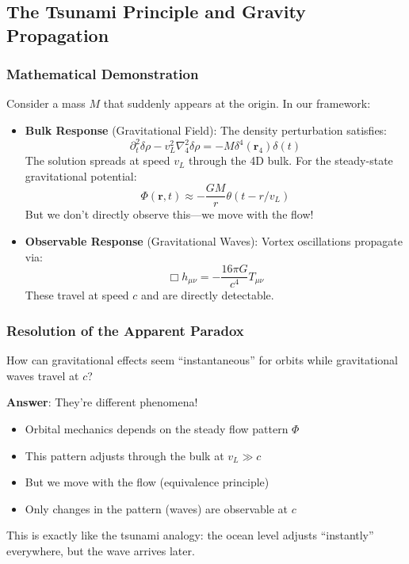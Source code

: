 \subsection{The Tsunami Principle and Gravity Propagation}

\subsubsection{Mathematical Demonstration}

Consider a mass $M$ that suddenly appears at the origin. In our framework:

\begin{itemize}
\item \textbf{Bulk Response} (Gravitational Field): The density perturbation satisfies:
$$\partial_t^2 \delta\rho - v_L^2 \nabla_4^2 \delta\rho = -M\delta^4(\mathbf{r}_4)\delta(t)$$
The solution spreads at speed $v_L$ through the 4D bulk. For the steady-state gravitational potential:
$$\Phi(\mathbf{r},t) \approx -\frac{GM}{r} \theta(t - r/v_L)$$
But we don't directly observe this---we move with the flow!

\item \textbf{Observable Response} (Gravitational Waves): Vortex oscillations propagate via:
$$\Box h_{\mu\nu} = -\frac{16\pi G}{c^4} T_{\mu\nu}$$
These travel at speed $c$ and are directly detectable.
\end{itemize}

\subsubsection{Resolution of the Apparent Paradox}

How can gravitational effects seem ``instantaneous'' for orbits while gravitational waves travel at $c$?

\textbf{Answer}: They're different phenomena!
\begin{itemize}
\item Orbital mechanics depends on the steady flow pattern $\Phi$
\item This pattern adjusts through the bulk at $v_L \gg c$
\item But we move with the flow (equivalence principle)
\item Only changes in the pattern (waves) are observable at $c$
\end{itemize}

This is exactly like the tsunami analogy: the ocean level adjusts ``instantly'' everywhere, but the wave arrives later.

